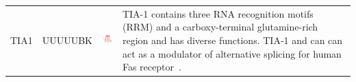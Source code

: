 \documentclass[a4paper,10pt]{article}
\begin{document}
\begin{center}
\begin{longtable}{|l|l|l|p{6cm}|}
\hline
TIA1 & UUUUUBK & \includegraphics[height=0.8in]{./seqLogo/TIA1_uuuuubk.pdf} &  TIA-1 contains three RNA recognition motifs (RRM) and a carboxy-terminal glutamine-rich region and has diverse functions. TIA-1 and can  can act as a modulator of alternative splicing for human Fas receptor~\cite{Foerch2000}.











\end{longtable}
\end{center}



\end{document}
